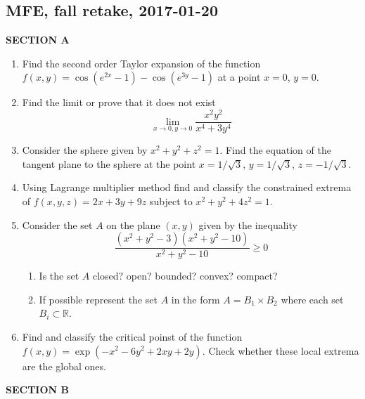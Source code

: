 \documentclass[12pt]{article} %
\theoremstyle{definition} %
\begin{document}
\subsection{MFE, fall retake, 2017-01-20}


\textbf{SECTION A}

\begin{enumerate}


\item Find the second order Taylor expansion of the function $f(x, y) = \cos( e^{2x} - 1) - \cos(e^{3y}-1)$ at a point $x = 0$, $y=0$.


\item Find the limit or prove that it does not exist
\[
\lim_{x \to 0, y \to 0} \frac{x^2 y^2}{x^4 + 3y^4}
\]


\item Consider the sphere given by $x^2 + y^2 + z^2 = 1$. Find the equation of the tangent plane to the sphere at the point $x=1/\sqrt{3}$, $y=1/\sqrt{3}$, $z=-1/\sqrt{3}$.

\item Using Lagrange multiplier method find and classify the constrained extrema of $f(x, y, z) =  2x +3y + 9z$ subject to $x^2 + y^2 + 4z^2 = 1$.


\item Consider the set $A$ on the plane $(x, y)$ given by the inequality
\[
\frac{(x^2 + y^2 - 3)(x^2 + y^2 -10)}{x^2 + y^2 - 10} \geq 0
\]
\begin{enumerate}
  \item Is the set $A$ closed? open? bounded? convex? compact?
  \item If possible represent the set $A$ in the form $A=B_1 \times B_2$ where each set $B_i \subset \mathbb{R}$.
\end{enumerate}


\item Find and classify the critical poinst of the function $f(x, y) =  \exp(-x^2 -6y^2 + 2xy + 2y)$. Check whether these local extrema are the global ones.





\end{enumerate}

\textbf{SECTION B}
\end{document}
